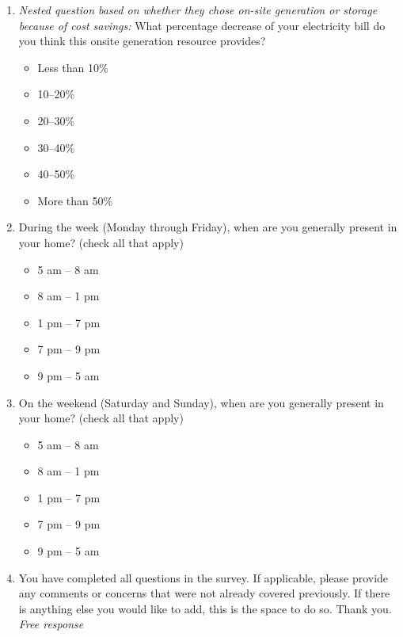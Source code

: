 \documentclass{article}
\begin{document}
\begin{enumerate}
\item \textit{Nested question based on whether they chose on-site generation or storage because of cost savings:}
What percentage decrease of your electricity bill do you think this onsite generation resource provides?
\begin{itemize}
  \item[\checkbox] Less than 10\%
  \item[\checkbox] 10--20\%
  \item[\checkbox] 20--30\%
  \item[\checkbox] 30--40\%
  \item[\checkbox] 40--50\%
  \item[\checkbox] More than 50\%
\end{itemize}
 

\item During the week (Monday through Friday), when are you generally present in your home? (check all that apply)
\begin{itemize}
  \item[\checkbox] 5 am -- 8 am
  \item[\checkbox] 8 am -- 1 pm
  \item[\checkbox] 1 pm -- 7 pm
  \item[\checkbox] 7 pm -- 9 pm
  \item[\checkbox] 9 pm -- 5 am
\end{itemize}
 

\item On the weekend (Saturday and Sunday), when are you generally present in your home? (check all that apply)
\begin{itemize}
  \item[\checkbox] 5 am -- 8 am
  \item[\checkbox] 8 am -- 1 pm
  \item[\checkbox] 1 pm -- 7 pm
  \item[\checkbox] 7 pm -- 9 pm
  \item[\checkbox] 9 pm -- 5 am
\end{itemize}
 

\item You have completed all questions in the survey. If applicable, please provide any comments or concerns that were not already covered previously. If there is anything else you would like to add, this is the space to do so. Thank you.\\
\textit{Free response}
\end{enumerate}
\end{document}
